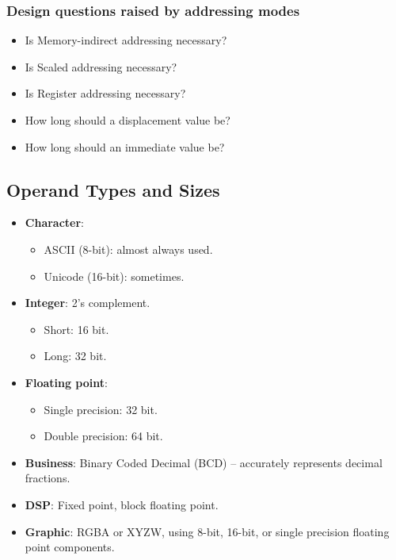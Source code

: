 \subsubsection{Design questions raised by addressing modes}

\begin{itemize}
  \item Is Memory-indirect addressing necessary?
  \item Is Scaled addressing necessary?
  \item Is Register addressing necessary?
  \item How long should a displacement value be?
  \item How long should an immediate value be?
\end{itemize}

\subsection{Operand Types and Sizes}
\label{sec:operands}

\begin{itemize}
  \item \textbf{Character}:
  \begin{itemize}
    \item ASCII (8-bit): almost always used.
    \item Unicode (16-bit): sometimes.
  \end{itemize}
  \item \textbf{Integer}: 2's complement.
  \begin{itemize}
    \item Short: 16 bit.
    \item Long: 32 bit.
  \end{itemize}
  \item \textbf{Floating point}:
  \begin{itemize}
    \item Single precision: 32 bit.
    \item Double precision: 64 bit.
  \end{itemize}
  \item \textbf{Business}: Binary Coded Decimal (BCD) -- accurately
  represents decimal fractions.
  \item \textbf{DSP}: Fixed point, block floating point.
  \item \textbf{Graphic}: RGBA or XYZW, using 8-bit, 16-bit, or single
  precision floating point components.
\end{itemize}

